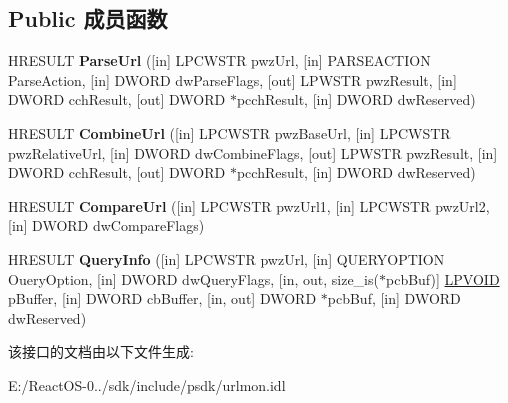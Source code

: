 \subsection*{Public 成员函数}
\begin{DoxyCompactItemize}
\item 
\mbox{\label{interface_i_internet_protocol_info_aae44be997bc19aead191cd42fe29d2ca}} 
H\+R\+E\+S\+U\+LT {\bfseries Parse\+Url} (\mbox{[}in\mbox{]} L\+P\+C\+W\+S\+TR pwz\+Url, \mbox{[}in\mbox{]} P\+A\+R\+S\+E\+A\+C\+T\+I\+ON Parse\+Action, \mbox{[}in\mbox{]} D\+W\+O\+RD dw\+Parse\+Flags, \mbox{[}out\mbox{]} L\+P\+W\+S\+TR pwz\+Result, \mbox{[}in\mbox{]} D\+W\+O\+RD cch\+Result, \mbox{[}out\mbox{]} D\+W\+O\+RD $\ast$pcch\+Result, \mbox{[}in\mbox{]} D\+W\+O\+RD dw\+Reserved)
\item 
\mbox{\label{interface_i_internet_protocol_info_a15ca19e3b09dda862739eb0ed51c4862}} 
H\+R\+E\+S\+U\+LT {\bfseries Combine\+Url} (\mbox{[}in\mbox{]} L\+P\+C\+W\+S\+TR pwz\+Base\+Url, \mbox{[}in\mbox{]} L\+P\+C\+W\+S\+TR pwz\+Relative\+Url, \mbox{[}in\mbox{]} D\+W\+O\+RD dw\+Combine\+Flags, \mbox{[}out\mbox{]} L\+P\+W\+S\+TR pwz\+Result, \mbox{[}in\mbox{]} D\+W\+O\+RD cch\+Result, \mbox{[}out\mbox{]} D\+W\+O\+RD $\ast$pcch\+Result, \mbox{[}in\mbox{]} D\+W\+O\+RD dw\+Reserved)
\item 
\mbox{\label{interface_i_internet_protocol_info_a678937d5cb81e189ade83e54224d08a7}} 
H\+R\+E\+S\+U\+LT {\bfseries Compare\+Url} (\mbox{[}in\mbox{]} L\+P\+C\+W\+S\+TR pwz\+Url1, \mbox{[}in\mbox{]} L\+P\+C\+W\+S\+TR pwz\+Url2, \mbox{[}in\mbox{]} D\+W\+O\+RD dw\+Compare\+Flags)
\item 
\mbox{\label{interface_i_internet_protocol_info_a402c4aa6d17d5d1d44a93ac52c4bbfc6}} 
H\+R\+E\+S\+U\+LT {\bfseries Query\+Info} (\mbox{[}in\mbox{]} L\+P\+C\+W\+S\+TR pwz\+Url, \mbox{[}in\mbox{]} Q\+U\+E\+R\+Y\+O\+P\+T\+I\+ON Ouery\+Option, \mbox{[}in\mbox{]} D\+W\+O\+RD dw\+Query\+Flags, \mbox{[}in, out, size\+\_\+is($\ast$pcb\+Buf)\mbox{]} \hyperlink{interfacevoid}{L\+P\+V\+O\+ID} p\+Buffer, \mbox{[}in\mbox{]} D\+W\+O\+RD cb\+Buffer, \mbox{[}in, out\mbox{]} D\+W\+O\+RD $\ast$pcb\+Buf, \mbox{[}in\mbox{]} D\+W\+O\+RD dw\+Reserved)
\end{DoxyCompactItemize}


该接口的文档由以下文件生成\+:\begin{DoxyCompactItemize}
\item 
E\+:/\+React\+O\+S-\/0../sdk/include/psdk/urlmon.\+idl\end{DoxyCompactItemize}
